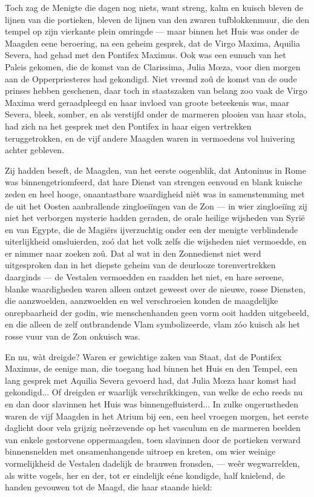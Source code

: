 \documentclass[a4paper, 12pt, oneside, dutch]{article}
\begin{document}
Toch zag de Menigte die dagen nog niets, want streng, kalm en kuisch bleven de lijnen van die portieken, bleven de lijnen van den zwaren tufblokkenmuur, die den tempel op zijn vierkante plein omringde --- maar binnen het Huis was onder de Maagden eene beroering, na een geheim gesprek, dat de Virgo Maxima, Aquilia Severa, had gehad met den Pontifex Maximus. Ook was een eunuch van het Paleis gekomen, die de komst van de Clarissima, Julia Mœza, voor dien morgen aan de Opperpriesteres had gekondigd. Niet vreemd zoû de komst van de oude prinses hebben geschenen, daar toch in staatszaken van belang zoo vaak de Virgo Maxima werd geraadpleegd en haar invloed van groote beteekenis was, maar Severa, bleek, somber, en als verstijfd onder de marmeren plooien van haar stola, had zich na het gesprek met den Pontifex in haar eigen vertrekken teruggetrokken, en de vijf andere Maagden waren in vermoedens vol huivering achter gebleven.

Zij hadden beseft, de Maagden, van het eerste oogenblik, dat Antoninus in Rome was binnengetriomfeerd, dat hare Dienst van strengen eenvoud en blank kuische zeden en heel hooge, onaantastbare waardigheid nièt was in samenstemming met de uit het Oosten aanbrallende zingloeiïngen van de Zon --- in wier zingloeiïng zij niet het verborgen mysterie hadden geraden, de orale heilige wijsheden van Syrië en van Egypte, die de Magiërs ijverzuchtig onder een der menigte verblindende uiterlijkheid omsluierden, zoó dat het volk zelfs die wijsheden niet vermoedde, en er nimmer naar zoeken zoû. Dat al wat in den Zonnedienst niet werd uitgesproken dan in het diepste geheim van de deurlooze torenvertrekken daarginds --- de Vestalen vermoedden en raadden het niet, en hare sereene, blanke waardigheden waren alleen ontzet geweest over de nieuwe, rosse Diensten, die aanzwoelden, aanzwoelden en wel verschroeien konden de maagdelijke onrepbaarheid der godin, wie menschenhanden geen vorm ooit hadden uitgebeeld, en die alleen de zelf ontbrandende Vlam symbolizeerde, vlam zóo kuisch als het rosse vuur van de Zon onkuisch was.

En nu, wàt dreigde? Waren er gewichtige zaken van Staat, dat de Pontifex Maximus, de eenige man, die toegang had binnen het Huis en den Tempel, een lang gesprek met Aquilia Severa gevoerd had, dat Julia Mœza haar komst had gekondigd... Of dreigden er waarlijk verschrikkingen, van welke de echo reeds nu en dan door slavinnen het Huis was binnengefluisterd... In zulke ongerustheden waren de vijf Maagden in het Atrium bij een, een heel vroegen morgen, het eerste daglicht door vela grijzig neêrzevende op het vasculum en de marmeren beelden van enkele gestorvene oppermaagden, toen slavinnen door de portieken verward binnensnelden met onsamenhangende uitroep en kreten, om wier weinige vormelijkheid de Vestalen dadelijk de brauwen fronsden, --- weêr wegwarrelden, als witte vogels, her en der, tot er eindelijk eéne kondigde, half knielend, de handen gevouwen tot de Maagd, die haar staande hield:
\end{document}
